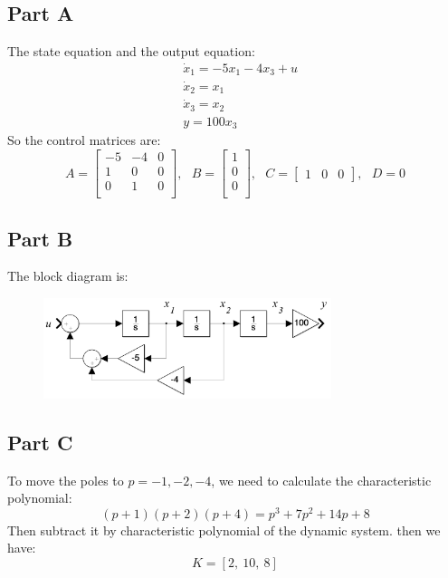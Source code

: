 \documentclass[a4paper]{article}
\begin{document}
\subsection{Part A}
The state equation and the output equation:
\begin{equation*}
\begin{aligned}
& \dot{x}_1 = -5 x_1 - 4x_3 + u\\
& \dot{x}_2 = x_1\\
& \dot{x}_3 = x_2\\
& y = 100x_3
\end{aligned}
\end{equation*}
So the control matrices are:
$$
A =  \left [
\begin{matrix}
   -5 & -4 & 0 \\
   1 & 0 & 0 \\
   0 & 1 & 0 \\
\end{matrix}
\right ], \ \ \  
B = \left [
\begin{matrix}
   1 \\
   0 \\
   0 \\
\end{matrix}
\right ],\ \ \ 
C = \left [
\begin{matrix}
   1 & 0 & 0 
\end{matrix}
\right ], \ \ \ 
D = 0
$$

\subsection{Part B}
The block diagram is:
\begin{figure}[H]
\centering
\includegraphics[width = 0.75\textwidth]{pic/1.png}
\end{figure}


\subsection{Part C}
To move the poles to $p = -1, -2, -4$, we need to calculate the characteristic polynomial:
$$
(p + 1)(p + 2)(p + 4) = p^3 + 7p^2 + 14p +8
$$
Then subtract it by characteristic polynomial of the dynamic system. then we have:
$$
K = [2,\ 10,\ 8]
$$
\end{document}
